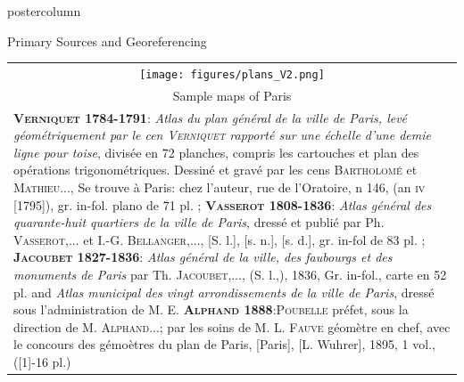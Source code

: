 \documentclass[final,hyperref={pdfpagelabels=false}]{beamer}
\begin{document}
\begin{frame}
\begin{columns}
\begin{column}{0.5\textwidth}
\begin{beamercolorbox}[center,wd=\textwidth]{postercolumn}
\begin{minipage}[t]{.98\textwidth}
\begin{block}{Primary Sources and Georeferencing}
\begin{tabular}{p{}p{}}
          \multicolumn{2}{c}{\texttt{[image: figures/plans\_V2.png]}}\\
	  \multicolumn{2}{c}{\scriptsize Sample maps of Paris}\\%
          \multicolumn{2}{p{0.9\textwidth}}{
            \tiny{
              \textsc{\textbf{Verniquet 1784-1791}:}
                \textit{Atlas du plan général de la ville de Paris, levé géométriquement par le cen \textsc{Verniquet} rapporté sur une échelle d'une demie ligne pour toise}, divisée en 72 planches, compris les cartouches et plan des opérations trigonométriques.
                Dessiné et gravé par les cens \textsc{Bartholomé} et \textsc{Mathieu}...,
                Se trouve à Paris: chez l'auteur, rue de l'Oratoire, n 146, (an \textsc{iv} [1795]), gr. in-fol. plano de 71 pl. ;
              \textsc{\textbf{Vasserot 1808-1836}:}
                \textit{Atlas général des quarante-huit quartiers de la ville de Paris}, dressé et publié par Ph. \textsc{Vasserot},... et I.-G. \textsc{Bellanger},..., [S. l.], [s. n.], [s. d.], gr. in-fol de 83 pl. ;
              \textsc{\textbf{Jacoubet 1827-1836}:}
                \textit{Atlas général de la ville, des faubourgs et des monuments de Paris} par Th. \textsc{Jacoubet},..., (S. l.,), 1836, Gr. in-fol., carte en 52 pl. and \textit{Atlas municipal des vingt arrondissements de la ville de Paris}, dressé sous l'administration de M. E.
              \textsc{\textbf{Alphand 1888}:}\textsc{Poubelle} préfet, sous la direction de M. \textsc{Alphand}...; par les soins de M. L. \textsc{Fauve} géomètre en chef, avec le concours des gémoètres du plan de Paris, [Paris], [L. Wuhrer], 1895, 1 vol., ([1]-16 pl.)
            }
          }\\
	  

\end{tabular}
\end{block}
\end{minipage}
\end{beamercolorbox}
\end{column}
\end{columns}
\end{frame}
\end{document}
